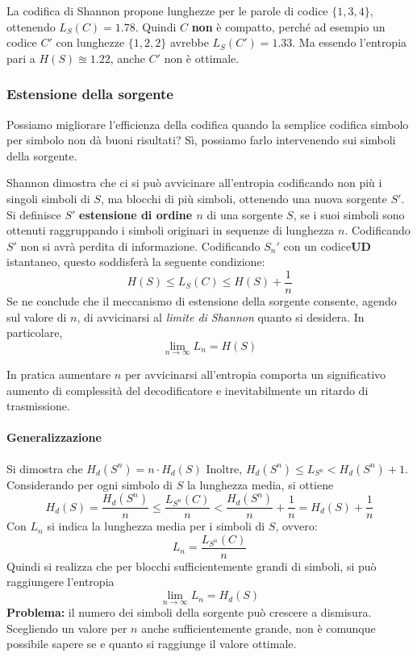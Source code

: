 La codifica di Shannon propone lunghezze per le parole di codice $\{1,3,4\}$, ottenendo $L_S(C) = 1.78$.
Quindi $C$ \textbf{non} è compatto, perché ad esempio un codice $C'$ con lunghezze $\{1,2,2\}$ avrebbe $L_S(C')=1.33$. Ma essendo l'entropia pari a $H(S) \approxeq 1.22$, anche $C'$ non è ottimale.


\subsubsection{Estensione della sorgente}
Possiamo migliorare l'efficienza della codifica quando la semplice codifica simbolo per simbolo non dà buoni risultati?
Sì, possiamo farlo intervenendo sui simboli della sorgente.

Shannon dimostra che ci si può avvicinare all'entropia codificando non più i singoli simboli di $S$, ma blocchi di più simboli, ottenendo una nuova sorgente $S'$.\\
Si definisce $S'$ \textbf{estensione di ordine $n$} di una sorgente $S$, se i suoi simboli sono ottenuti raggruppando i simboli originari in sequenze di lunghezza $n$. Codificando $S'$ non si avrà perdita di informazione.
Codificando $S_n'$ con un codice\textbf{UD} istantaneo, questo soddisferà la seguente condizione:
\[H(S) \leq L_S(C) \leq H(S) + \frac{1}{n}\]
Se ne conclude che il meccanismo di estensione della sorgente consente, agendo sul valore di $n$, di avvicinarsi al \textit{limite di Shannon} quanto si desidera.
In particolare,
\[\lim_{n\to\infty} L_n = H(S)\]
\begin{osservazione}
In pratica aumentare $n$ per avvicinarsi all'entropia comporta un significativo aumento di complessità del decodificatore e inevitabilmente un ritardo di trasmissione.
\end{osservazione}

\paragraph{Generalizzazione}
Si dimostra che $H_d(S^n) = n \cdot H_d(S)$
Inoltre, $H_d(S^n)\leq L_{S^n}<H_d(S^n)+1$.
Considerando per ogni simbolo di $S$ la lunghezza media, si ottiene
\[H_d(S) = \frac{H_d(S^n)}{n}\leq \frac{L_{S^n}(C)}{n}<\frac{H_d(S^n)}{n}+\frac{1}{n} = H_d(S) + \frac{1}{n}\]
Con $L_n$ si indica la lunghezza media per i simboli di $S$, ovvero:
\[ L_n = \frac{L_{S^n}(C)}{n} \]
Quindi si realizza che  per blocchi sufficientemente grandi di simboli, si può raggiungere l'entropia
\[\lim_{n\to\infty}L_n = H_d(S)\]
\textbf{Problema:} il numero dei simboli della sorgente può crescere a dismisura. Scegliendo un valore per $n$ anche sufficientemente grande, non è comunque possibile sapere se e quanto si raggiunge il valore ottimale.

